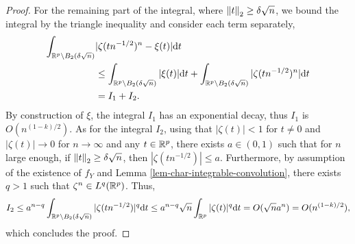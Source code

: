 \begin{proof}
    For the remaining part of the integral, where $\norm{t}_2 \geq \delta \sqrt{n}$, we bound the integral by the triangle inequality and consider each term separately,
    \begin{align*}
        \int_{\Rp \setminus B_2(\delta\sqrt{n})} &|\zeta(tn^{-1/2})^n - \xi(t)| \d t \\
        &\leq \int_{\Rp \setminus B_2(\delta\sqrt{n})} |\xi(t)| \d t + \int_{\Rp \setminus B_2(\delta\sqrt{n})} |\zeta(tn^{-1/2})^n| \d t\\
        &= I_1 + I_2.
    \end{align*}
    By construction of $\xi$, the integral $I_1$ has an exponential decay, thus $I_1$ is $O(n^{(1 - k)/2})$. As for the integral $I_2$, using that $|\zeta(t)| < 1$ for $t \neq 0$ and $|\zeta(t)| \rightarrow 0$ for $n \rightarrow \infty$ and any $t \in \Rp$, there exists $a \in (0, 1)$ such that for $n$ large enough, if $\norm{t}_2 \geq \delta\sqrt{n}$, then $|\zeta(tn^{-1/2})| \leq a$. Furthermore, by assumption of the existence of $f_Y$ and Lemma \ref{lem-char-integrable-convolution}, there exists $q > 1$ such that $\zeta^n \in L^q(\Rp)$. Thus,
    \begin{equation*}
        I_2
        \leq a^{n-q} \int_{\Rp \setminus B_2(\delta\sqrt{n})} |\zeta(tn^{-1/2})|^q \d t 
        \leq a^{n-q}\sqrt{n}\intRp{t}{|\zeta(t)|^q} 
        = O(\sqrt{n}a^n) = O(n^{(1-k)/2}),
    \end{equation*}
    which concludes the proof.
\end{proof}